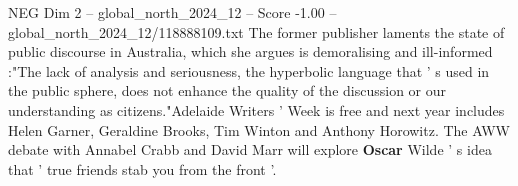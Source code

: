 \begin{textsample}{NEG Dim 2 – global\_north\_2024\_12 – Score -1.00 – global\_north\_2024\_12/118888109.txt}
The former publisher laments the state of public discourse in Australia, which she argues is demoralising and ill-informed :"The lack of analysis and seriousness, the hyperbolic language that ' s used in the public sphere, does not enhance the quality of the discussion or our understanding as citizens."Adelaide Writers ' Week is free and next year includes Helen Garner, Geraldine Brooks, Tim Winton and Anthony Horowitz.
The AWW debate with Annabel Crabb and David Marr will explore \textbf{Oscar} Wilde ' s idea that ' true friends stab you from the front '.

\end{textsample}
